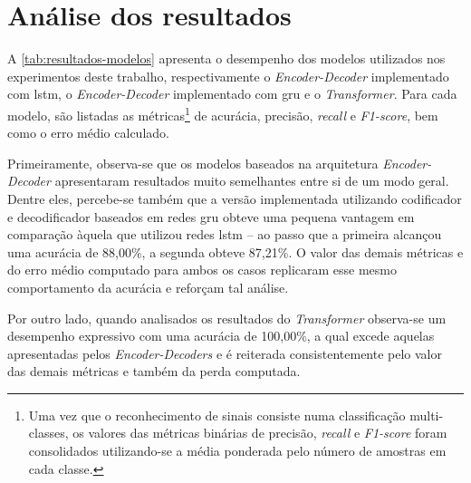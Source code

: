 \section{Análise dos resultados}
\label{sec:avaliacao-resultados}

A \autoref{tab:resultados-modelos} apresenta o desempenho dos modelos utilizados nos experimentos deste trabalho, respectivamente o \textit{Encoder-Decoder} implementado com \acrshort{lstm}, o \textit{Encoder-Decoder} implementado com \acrshort{gru} e o \textit{Transformer}.
Para cada modelo, são listadas as métricas\footnote{
    Uma vez que o reconhecimento de sinais consiste numa classificação multi-classes, os valores das métricas binárias de precisão, \textit{recall} e \textit{F1-score} foram consolidados utilizando-se a média ponderada pelo número de amostras em cada classe.
} de acurácia, precisão, \textit{recall} e \textit{F1-score}, bem como o erro médio calculado.





Primeiramente, observa-se que os modelos baseados na arquitetura \textit{Encoder-Decoder} apresentaram resultados muito semelhantes entre si de um modo geral.
Dentre eles, percebe-se também que a versão implementada utilizando codificador e decodificador baseados em redes \acrshort{gru} obteve uma pequena vantagem em comparação àquela que utilizou redes \acrshort{lstm} -- ao passo que a primeira alcançou uma acurácia de 88,00\%, a segunda obteve 87,21\%.
O valor das demais métricas e do erro médio computado para ambos os casos replicaram esse mesmo comportamento da acurácia e reforçam tal análise.

Por outro lado, quando analisados os resultados do \textit{Transformer} observa-se um desempenho expressivo com uma acurácia de 100,00\%, a qual excede aquelas apresentadas pelos \textit{Encoder-Decoders} e é reiterada consistentemente pelo valor das demais métricas e também da perda computada.

